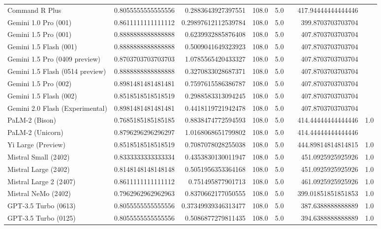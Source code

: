 \begin{table}[htp]
{\begin{tabular}{lrrrrrrr}
Command R Plus & 0.8055555555555556 & 0.2883643927397551 & 108.0 & 5.0 &  & 417.94444444444446 &  \\
Gemini 1.0 Pro (001) & 0.8611111111111112 & 0.29897612112539784 & 108.0 & 5.0 &  & 399.8703703703704 &  \\
Gemini 1.5 Pro (001) & 0.8888888888888888 & 0.6239932885876408 & 108.0 & 5.0 &  & 407.8703703703704 &  \\
Gemini 1.5 Flash (001) & 0.8888888888888888 & 0.5009041649323923 & 108.0 & 5.0 &  & 407.8703703703704 &  \\
Gemini 1.5 Pro (0409 preview) & 0.8703703703703703 & 1.0785565420433327 & 108.0 & 5.0 &  & 407.8703703703704 &  \\
Gemini 1.5 Flash (0514 preview) & 0.8888888888888888 & 0.3270833028687371 & 108.0 & 5.0 &  & 407.8703703703704 &  \\
Gemini 1.5 Pro (002) & 0.8981481481481481 & 0.7597615586386787 & 108.0 & 5.0 &  & 407.8703703703704 &  \\
Gemini 1.5 Flash (002) & 0.8518518518518519 & 0.2988583313094245 & 108.0 & 5.0 &  & 407.8703703703704 &  \\
Gemini 2.0 Flash (Experimental) & 0.8981481481481481 & 0.4418119721942478 & 108.0 & 5.0 &  & 407.8703703703704 &  \\
PaLM-2 (Bison) & 0.7685185185185185 & 0.8838474772594593 & 108.0 & 5.0 &  & 414.44444444444446 & 1.0 \\
PaLM-2 (Unicorn) & 0.8796296296296297 & 1.0168068651799802 & 108.0 & 5.0 &  & 414.44444444444446 &  \\
Yi Large (Preview) & 0.8518518518518519 & 0.7087078028255038 & 108.0 & 5.0 &  & 444.89814814814815 & 1.0 \\
Mistral Small (2402) & 0.8333333333333334 & 0.4353830130011947 & 108.0 & 5.0 &  & 451.0925925925926 & 1.0 \\
Mistral Large (2402) & 0.8148148148148148 & 0.5051956353364168 & 108.0 & 5.0 &  & 451.0925925925926 & 1.0 \\
Mistral Large 2 (2407) & 0.8611111111111112 & 0.751495877901713 & 108.0 & 5.0 &  & 461.0925925925926 & 1.0 \\
Mistral NeMo (2402) & 0.7962962962962963 & 0.8370662177050555 & 108.0 & 5.0 &  & 399.01851851851853 & 1.0 \\
GPT-3.5 Turbo (0613) & 0.8055555555555556 & 0.37349939346313477 & 108.0 & 5.0 &  & 387.6388888888889 & 1.0 \\
GPT-3.5 Turbo (0125) & 0.8055555555555556 & 0.5086877279811435 & 108.0 & 5.0 &  & 394.6388888888889 & 1.0 \\

\end{tabular}}
\end{table}
